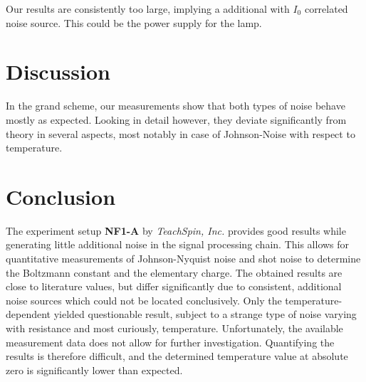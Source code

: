 \documentclass[
    parskip=half, 
    twoside=false,
    twocolumn=true,
    fontsize=11pt,
]{scrarticle}
\begin{document}
Our results are consistently too large, implying a additional with $I_0$ correlated noise source. 
This could be the power supply for the lamp.

\section{Discussion}
In the grand scheme, our measurements show that both types of noise behave mostly as expected. Looking in detail however, they deviate significantly from theory in several aspects, most notably in case of Johnson-Noise with respect to temperature.

\section{Conclusion}
The experiment setup \textbf{NF1-A} by \textit{TeachSpin, Inc.} provides good results while generating little additional noise in the signal processing chain. This allows for quantitative measurements of Johnson-Nyquist noise and shot noise to determine the Boltzmann constant and the elementary charge. The obtained results are close to literature values, but differ significantly due to consistent, additional noise sources which could not be located conclusively. Only the temperature-dependent yielded questionable result, subject to a strange type of noise varying with resistance and most curiously, temperature. Unfortunately, the available measurement data does not allow for further investigation. Quantifying the results is therefore difficult, and the determined temperature value at absolute zero is significantly lower than expected.

\nocite{*}
\printbibliography
\end{document}
